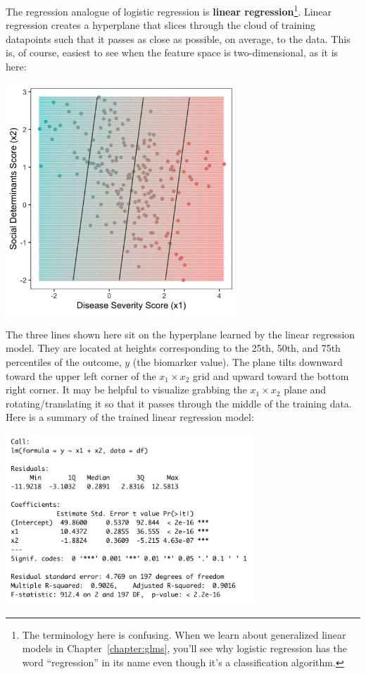 The regression analogue of logistic regression is \textbf{linear regression}\footnote{The terminology here is confusing. When we learn about generalized linear models in Chapter~\ref{chapter:glms}, you'll see why logistic regression has the word ``regression'' in its name even though it's a classification algorithm.}. Linear regression creates a hyperplane that slices through the cloud of training datapoints such that it passes as close as possible, on average, to the data. This is, of course, easiest to see when the feature space is two-dimensional, as it is here:

\begin{center}
\includegraphics[width=0.65\textwidth]{img/esl-reg-linear.png}
\end{center}
The three lines shown here sit on the hyperplane learned by the linear regression model. They are located at heights corresponding to the 25th, 50th, and 75th percentiles of the outcome, $y$ (the biomarker value). The plane tilts downward toward the upper left corner of the $x_1 \times x_2$ grid and upward toward the bottom right corner. It may be helpful to visualize grabbing the $x_1 \times x_2$ plane and rotating/translating it so that it passes through the middle of the training data. Here is a summary of the trained linear regression model:

\begin{center}
\includegraphics[width=0.7\textwidth]{img/linear-regression-model-output.png}
\end{center} 

